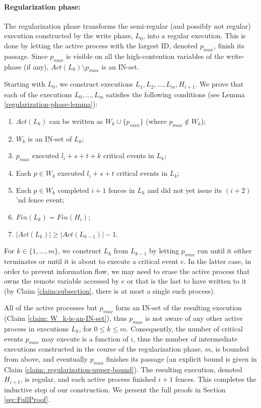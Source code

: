 \paragraph{Regularization phase:} The regularization phase transforms the semi-regular (and possibly not regular) execution constructed by the write phase, $L_0$, into a regular execution. This is done by letting the active process with the largest ID, denoted $p_{max}$, finish its passage. Since $p_{max}$ is visible on all the high-contention variables of the write-phase (if any), $Act(L_0) \setminus {p_{max}}$ is an IN-set.

Starting with $L_0$, we construct executions $L_1,L_2,\ldots,L_m,H_{i+1}$. We prove that each of the executions $L_0, \ldots, L_m$  satisfies the following conditions (see Lemma \ref{regularization-phase-lemma}):

\begin{enumerate}[(1)]
	\item $Act(L_k)$ can be written as $W_k \cup \{p_{max}\}$ (where $p_{max} \notin W_k$);
	\item $W_k$ is an IN-set of $L_k$;
	\item $p_{max}$ executed $l_i+s+t+k$ critical events in $L_k$;
	\item Each $p \in W_k$ executed $l_i+s+t$ critical events in $L_k$;
	\item Each $p \in W_k$ completed $i+1$ fences in $L_k$ and did not yet issue its $(i+2)$'nd fence event;
	\item $Fin(L_k) = Fin(H_i)$;
	\item $|Act(L_k)| \geq |Act(L_{k-1})|-1$.
\end{enumerate}

For $k \in \{1, \ldots, m\}$, we construct $L_k$ from $L_{k-1}$ by letting $p_{max}$ run until it either terminates or until it is about to execute a critical event $e$. In the latter case, in order to prevent information flow, we may need to erase the active process that owns the remote variable accessed by $e$ or that is the last to have written to it (by Claim \ref{claim:subsection}, there is at most a single such process).

All of the active processes but $p_{max}$ form an IN-set of the resulting execution (Claim \ref{claim: W_k-is-an-IN-set}), thus $p_{max}$ is not aware of any other active process in executions $L_k$, for $0 \leq k \leq m$. Consequently, the number of critical events $p_{max}$ may execute is a function of $i$, thus the number of intermediate executions constructed in the course of the regularization phase, $m$, is bounded from above, and eventually $p_{max}$ finishes its passage (an explicit bound is given in Claim \ref{claim: regularization-upper-bound}). The resulting execution, denoted $H_{i+1}$, is regular, and each active process finished $i+1$ fences. This completes the inductive step of our construction. We present the full proofs in Section \ref{sec:FullProof}.

